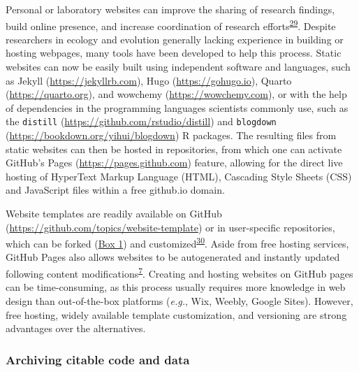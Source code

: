 Personal or laboratory websites can improve the sharing of research findings, build online presence, and increase coordination of research efforts\textsuperscript{\protect\hyperlink{ref-HiIPSSHV}{29}}.
Despite researchers in ecology and evolution generally lacking experience in building or hosting webpages, many tools have been developed to help this process.
Static websites can now be easily built using independent software and languages, such as Jekyll (\url{https://jekyllrb.com}), Hugo (\url{https://gohugo.io}), Quarto (\url{https://quarto.org}), and wowchemy (\url{https://wowchemy.com}), or with the help of dependencies in the programming languages scientists commonly use, such as the \texttt{distill} (\url{https://github.com/rstudio/distill}) and \texttt{blogdown} (\url{https://bookdown.org/yihui/blogdown}) R packages.
The resulting files from static websites can then be hosted in repositories, from which one can activate GitHub's Pages (\url{https://pages.github.com}) feature, allowing for the direct live hosting of HyperText Markup Language (HTML), Cascading Style Sheets (CSS) and JavaScript files within a free github.io domain.

Website templates are readily available on GitHub (\url{https://github.com/topics/website-template}) or in user-specific repositories, which can be forked (\protect\hyperlink{definitions}{Box 1}) and customized\textsuperscript{\protect\hyperlink{ref-MXxgZJ45}{30}}.
Aside from free hosting services, GitHub Pages also allows websites to be autogenerated and instantly updated following content modifications\textsuperscript{\protect\hyperlink{ref-RVetqmsg}{7}}.
Creating and hosting websites on GitHub pages can be time-consuming, as this process usually requires more knowledge in web design than out-of-the-box platforms (\emph{e.g.}, Wix, Weebly, Google Sites).
However, free hosting, widely available template customization, and versioning are strong advantages over the alternatives.

\hypertarget{archiving-citable-code-and-data}{%
\subsubsection{Archiving citable code and data}\label{archiving-citable-code-and-data}}

